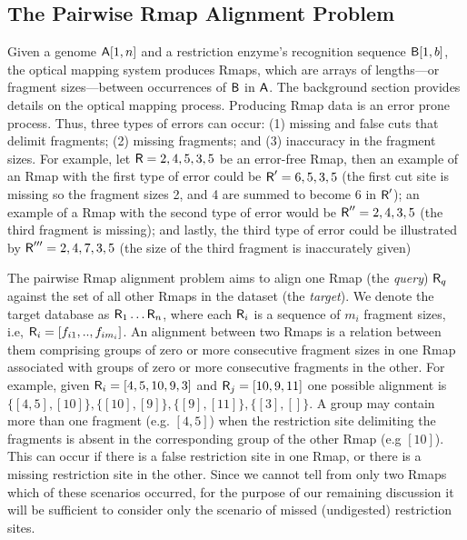 \subsection{The Pairwise Rmap Alignment Problem}




Given a genome $\mathsf{A}[1,n]$ and a restriction enzyme's recognition sequence $\mathsf{B}[1,b]$, the optical mapping system produces Rmaps, which are arrays of lengths---or fragment sizes---between occurrences of $\mathsf{B}$ in $\mathsf{A}$. The background section provides details on the optical mapping process.  Producing Rmap data is an error prone process. Thus, three types of errors can occur: (1) missing and false cuts that delimit fragments; (2) missing fragments; and (3) inaccuracy in the fragment sizes.  For example, let $\mbox{\rm {\sf R}} = 2,4,5,3,5$ be an error-free Rmap, then an example of an Rmap with the first type of error could be $\mbox{\rm {\sf R}}' = 6,5,3,5$ (the first cut site is missing so the fragment sizes 2, and 4 are summed to become 6 in $\mbox{\rm {\sf R}}'$); an example of a Rmap with the second type of error would be $\mbox{\rm {\sf R}}'' = 2,4,3,5$ (the third fragment is missing); and lastly, the third type of error could be illustrated by $\mbox{\rm {\sf R}}''' = 2,4,7,3,5$ (the size of the third fragment is inaccurately given)



The pairwise Rmap alignment problem aims to align one Rmap (the \emph{query}) $\mbox{\rm {\sf R}}_q$ against the set of all other Rmaps in the dataset (the \emph{target}). We denote the target database as $\mbox{\rm {\sf R}}_1 \ldots \mbox{\rm {\sf R}}_n$, where each $\mbox{\rm {\sf R}}_i$  is a sequence of $m_i$ fragment sizes, i.e, $\mbox{\rm {\sf R}}_i = [f_{i1}, .., f_{im_i}]$.  An alignment between two Rmaps is a relation between them comprising groups of zero or more consecutive fragment sizes in one Rmap associated with groups of zero or more consecutive fragments in the other.  For example, given $\mbox{\rm {\sf R}}_i =  [4, 5, 10, 9, 3]$ and $\mbox{\rm {\sf R}}_j = [10, 9, 11]$ one possible alignment is $\{[4,5], [10]\}, \{ [10], [9]\}, \{[9], [11]\}, \{[3], []\}$.  A group may contain more than one fragment (e.g. $[4,5]$) when the restriction site delimiting the fragments is absent in the corresponding group of the other Rmap (e.g $[10]$). This can occur if there is a false restriction site in one Rmap, or there is a missing restriction site in the other.  Since we cannot tell from only two Rmaps which of these scenarios occurred, for the purpose of our remaining discussion it will be sufficient to consider only the scenario of missed (undigested) restriction sites.




